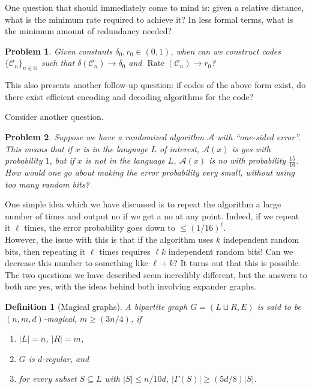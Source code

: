 \documentclass{article}
\newtheorem{definition}[theorem]{Definition}
\newtheorem*{problem*}{Problem}
\newcommand{\Rt}{\operatorname{Rate}}
\newcommand{\N}{\mathbb{N}}
\begin{document}
	One question that should immediately come to mind is: given a relative distance, what is the minimum rate required to achieve it? In less formal terms, what is the minimum amount of redundancy needed?

	\begin{problem*}
		Given constants $\delta_0,r_0 \in (0,1)$, when can we construct codes $\{\mathcal{C}_n\}_{n \in \N}$ such that $\delta(\mathcal{C}_n) \to \delta_0$ and $\Rt(\mathcal{C}_n) \to r_0$?
	\end{problem*}
	This also presents another follow-up question: if codes of the above form exist, do there exist efficient encoding and decoding algorithms for the code?


	Consider another question.
	\begin{problem*}
		Suppose we have a randomized algorithm $\mathcal{A}$ with ``one-sided error''. This means that if $x$ is in the language $L$ of interest, $\mathcal{A}(x)$ is yes with probability $1$, but if $x$ is not in the language $L$, $\mathcal{A}(x)$ is no with probability $\frac{15}{16}$.\\
		How would one go about making the error probability very small, without using too many random bits?
	\end{problem*}

	One simple idea which we have discussed is to repeat the algorithm a large number of times and output no if we get a no at any point. Indeed, if we repeat it $\ell$ times, the error probability goes down to $\le (1/16)^{\ell}$. \\
	However, the issue with this is that if the algorithm uses $k$ independent random bits, then repeating it $\ell$ times requires $\ell k$ independent random bits! Can we decrease this number to something like $\ell+k$? It turns out that this is possible.\\

	The two questions we have described seem incredibly different, but the answers to both are yes, with the ideas behind both involving expander graphs.

	\begin{definition}[Magical graphs]
		A bipartite graph $G = (L\sqcup R, E)$ is said to be \emph{$(n,m,d)$-magical}, $m \ge (3n/4)$, if
		\begin{enumerate}
			\item $|L|=n$, $|R|=m$,
			\item $G$ is $d$-regular, and
			\item for every subset $S \subseteq L$ with $|S| \le n/10d$, $|\Gamma(S)| \ge (5d/8)|S|$.
		\end{enumerate}
	\end{definition}
\end{document}
